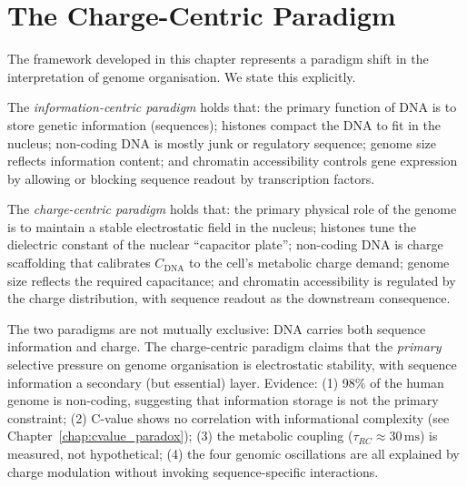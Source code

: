 \section{The Charge-Centric Paradigm}
\label{sec:charge_paradigm}

The framework developed in this chapter represents a paradigm shift in
the interpretation of genome organisation. We state this explicitly.

\begin{definition}
\label{def:info_centric}
The \emph{information-centric paradigm} holds that: the primary function
of DNA is to store genetic information (sequences); histones compact the
DNA to fit in the nucleus; non-coding DNA is mostly junk or regulatory
sequence; genome size reflects information content; and chromatin
accessibility controls gene expression by allowing or blocking
sequence readout by transcription factors.
\end{definition}

\begin{definition}
\label{def:charge_centric}
The \emph{charge-centric paradigm} holds that: the primary physical
role of the genome is to maintain a stable electrostatic field in the
nucleus; histones tune the dielectric constant of the nuclear
``capacitor plate''; non-coding DNA is charge scaffolding that calibrates
$C_{\mathrm{DNA}}$ to the cell's metabolic charge demand; genome size
reflects the required capacitance; and chromatin accessibility is
regulated by the charge distribution, with sequence readout as the
downstream consequence.
\end{definition}

\begin{remark}
The two paradigms are not mutually exclusive: DNA carries both sequence
information and charge. The charge-centric paradigm claims that the
\emph{primary} selective pressure on genome organisation is electrostatic
stability, with sequence information a secondary (but essential) layer.
Evidence: (1) 98\% of the human genome is non-coding, suggesting that
information storage is not the primary constraint; (2) C-value shows
no correlation with informational complexity (see Chapter~\ref{chap:cvalue_paradox});
(3) the metabolic coupling ($\tau_{RC} \approx 30\,\mathrm{ms}$) is
measured, not hypothetical; (4) the four genomic oscillations are all
explained by charge modulation without invoking sequence-specific interactions.
\end{remark}


